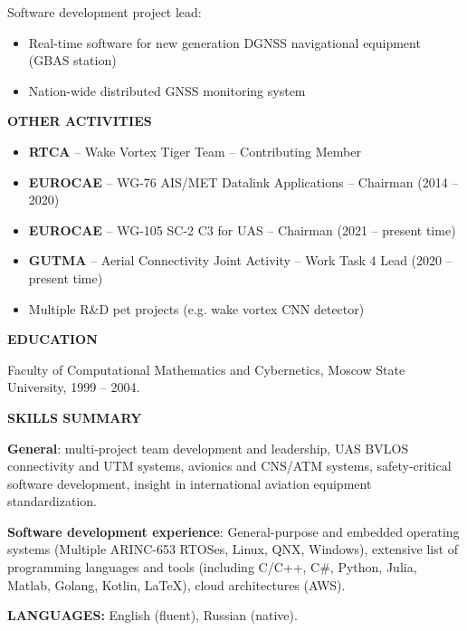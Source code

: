 \documentclass[a4paper]{article}
\begin{document}
    Software development project lead:
	\begin{itemize}
		\setlength{\itemindent}{.5cm}
	    \item Real-time software for new generation DGNSS navigational equipment (GBAS station)
	    \item Nation-wide distributed GNSS monitoring system
    \end{itemize}
    \vspace{3mm}
    
    \textbf{OTHER ACTIVITIES}

	\begin{itemize}
	    \setlength{\itemindent}{.5cm}	
	    \item \textbf{RTCA} -- Wake Vortex Tiger Team -- Contributing Member
	    \item \textbf{EUROCAE} -- WG-76 AIS/MET Datalink Applications -- Chairman (2014 -- 2020)
	    \item \textbf{EUROCAE} -- WG-105 SC-2 C3 for UAS -- Chairman (2021 -- present time)
	    \item \textbf{GUTMA} -- Aerial Connectivity Joint Activity -- Work Task 4 Lead (2020 -- present time)
	    \item Multiple R\&D pet projects (e.g. wake vortex CNN detector)
    \end{itemize}
    \vspace{3mm}
    
    \textbf{EDUCATION}
    \vspace{3mm}
    
    Faculty of Computational Mathematics and Cybernetics, Moscow State University, 1999 -- 2004.
    \vspace{5mm}
    
    \textbf{SKILLS SUMMARY}
    \vspace{3mm}
    
    \textbf{General}: multi-project team development and leadership, UAS BVLOS connectivity and UTM systems, avionics and CNS/ATM systems, safety-critical software development, insight in international aviation equipment standardization.
    \vspace{3mm}
    
    \textbf{Software development experience}: General-purpose and embedded operating systems (Multiple ARINC-653 RTOSes, Linux, QNX, Windows), extensive list of programming languages and tools (including C/C++, C\#, Python, Julia, Matlab, Golang, Kotlin, LaTeX), cloud architectures (AWS).
    \vspace{5mm}
    
    \textbf{LANGUAGES:} English (fluent), Russian (native).
\end{document}
